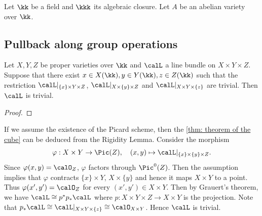 Let \(\kk\) be a field and \(\kkk\) its algebraic closure.
Let \(A\) be an abelian variety over \(\kk\).

\subsection{Pullback along group operations}

        

    \begin{theorem}\label{thm: theorem of the cube}
        Let \(X,Y,Z\) be proper varieties over \(\kk\) and \(\calL\) a line bundle on \(X \times Y \times Z\). 
        Suppose that there exist \(x \in X(\kk), y \in Y(\kk), z \in Z(\kk)\) such that the restriction \(\calL|_{\{x\} \times Y \times Z}\), \(\calL|_{X \times \{y\} \times Z}\) and \(\calL|_{X \times Y \times \{z\}}\) are trivial. 
        Then \(\calL\) is trivial.
    \end{theorem}
    \begin{proof}
    \end{proof}

    \begin{remark}\label{rmk: theorem of the cube by rigidity lemma and picard scheme}
        If we assume the existence of the Picard scheme, then the \cref{thm: theorem of the cube} can be deduced from the Rigidity Lemma.
        Consider the morphism
        \[ \varphi: X \times Y \to \Pic(Z), \quad (x,y) \mapsto \calL|_{\{x\} \times \{y\} \times Z}. \]
        Since \(\varphi(x,y) = \calO_Z\), \(\varphi\) factors through \(\Pic^0(Z)\).
        Then the assumption implies that \(\varphi\) contracts \(\{x\} \times Y\), \(X \times \{y\}\) and hence it maps \(X \times Y\) to a point.
        Thus \(\varphi(x',y') = \calO_Z\) for every \((x',y') \in X \times Y\).
        Then by Grauert's theorem, we have \(\calL \cong p^*p_*\calL\) where \(p: X \times Y \times Z \to X \times Y\) is the projection.
        Note that \(p_*\calL \cong \calL|_{X \times Y \times \{z\}} \cong \calO_{X \times Y}\).
        Hence \(\calL\) is trivial.
    \end{remark}

